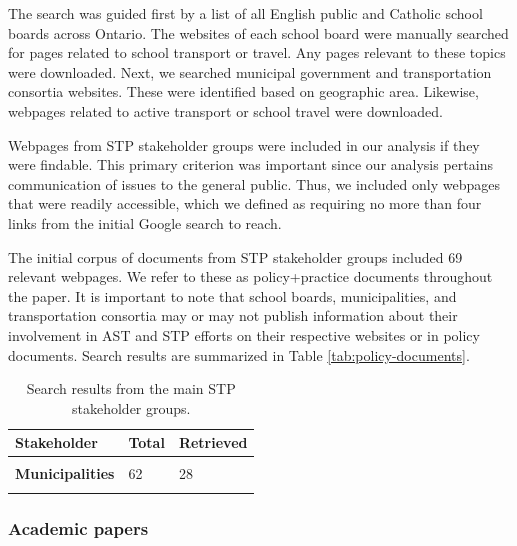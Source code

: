 \documentclass[preprint, 3p,
authoryear]{elsarticle} %
\begin{document}
The search was guided first by a list of all English public and Catholic
school boards across Ontario. The websites of each school board were
manually searched for pages related to school transport or travel. Any
pages relevant to these topics were downloaded. Next, we searched
municipal government and transportation consortia websites. These were
identified based on geographic area. Likewise, webpages related to
active transport or school travel were downloaded.

Webpages from STP stakeholder groups were included in our analysis if
they were findable. This primary criterion was important since our
analysis pertains communication of issues to the general public. Thus,
we included only webpages that were readily accessible, which we defined
as requiring no more than four links from the initial Google search to
reach.

The initial corpus of documents from STP stakeholder groups included 69
relevant webpages. We refer to these as policy+practice documents
throughout the paper. It is important to note that school boards,
municipalities, and transportation consortia may or may not publish
information about their involvement in AST and STP efforts on their
respective websites or in policy documents. Search results are
summarized in Table \ref{tab:policy-documents}.

\begin{table}

\caption{\label{tab:policy-documents}\label{tab:search-results}Search results from the main STP stakeholder groups.}
\centering
\begin{tabular}[t]{>{}l|l|>{}l}
\toprule
Stakeholder & Total & Retrieved\\
\midrule
\cellcolor{gray!6}{\textbf{School boards}} & \cellcolor{gray!6}{62} & \cellcolor{gray!6}{32}\\
\textbf{Municipalities} & 62 & 28\\
\cellcolor{gray!6}{\textbf{Transportation consortia}} & \cellcolor{gray!6}{39} & \cellcolor{gray!6}{9}\\
\bottomrule
\end{tabular}
\end{table}

\hypertarget{academic-papers}{%
\subsubsection{Academic papers}\label{academic-papers}}
\end{document}
